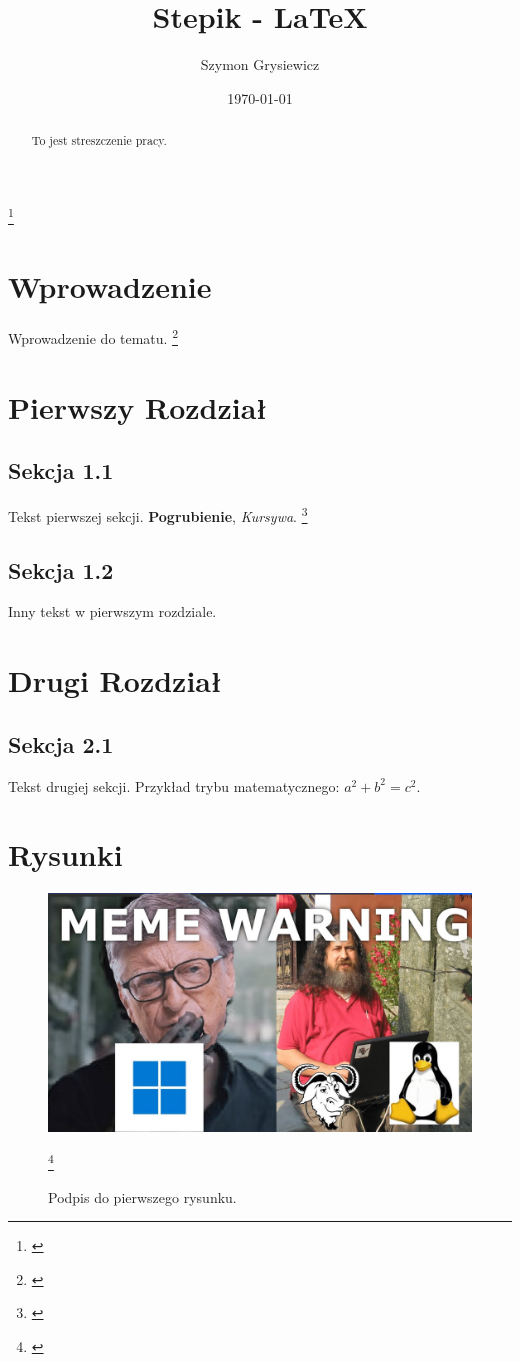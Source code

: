 \documentclass[polski]{article}
\title{Stepik - LaTeX}
\author{Szymon Grysiewicz}
\date{\today}
\begin{document}
\maketitle

\begin{abstract}
    To jest streszczenie pracy. \lipsum[1]
\end{abstract}
\footnote{\cite{artykul1}}
\tableofcontents

\section{Wprowadzenie}
Wprowadzenie do tematu.
\footnote{\cite{artykul2}}
\section{Pierwszy Rozdział}
\subsection{Sekcja 1.1}
Tekst pierwszej sekcji. \textbf{Pogrubienie}, \textit{Kursywa}.
\footnote{\cite{ksiazka}}
\subsection{Sekcja 1.2}
Inny tekst w pierwszym rozdziale.

\section{Drugi Rozdział}
\subsection{Sekcja 2.1}
Tekst drugiej sekcji. Przykład trybu matematycznego: $a^2 + b^2 = c^2$.

\section{Rysunki}
\begin{figure}[h]
    \centering
    \includegraphics[width=0.5\linewidth]{rysunek1.jpg}
    \caption{Podpis do pierwszego rysunku.}
    \label{sec:rysunek1}
    \footnote{\cite{referat}}
\end{figure}
\end{document}
